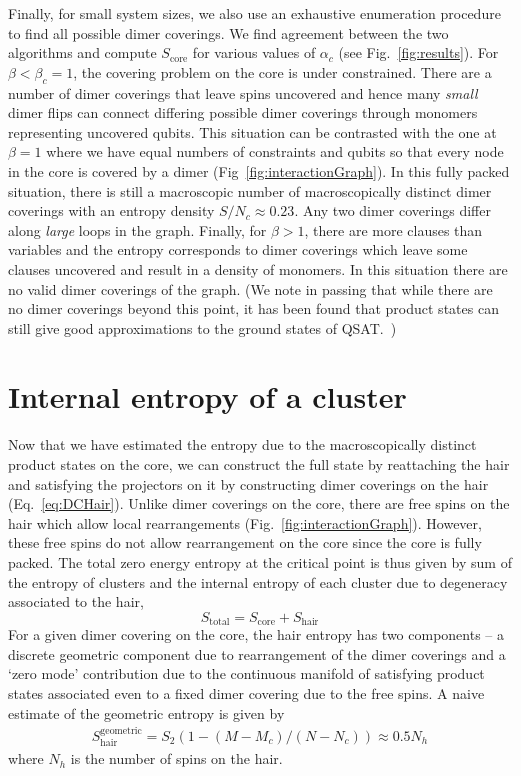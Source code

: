 \documentclass[aps,pra,twocolumn,superscriptaddress,amsmath]{revtex4-1}
\newcommand{\Sc}{S_{\mathrm{core}}}
\begin{document}
Finally, for small system sizes, we also use an exhaustive enumeration procedure to find all possible dimer coverings.
We find agreement between the two algorithms and compute $\Sc$ for various values of $\alpha_{c}$ (see Fig.~\ref{fig:results}). 
For $\beta< \beta_c = 1$, the covering problem on the core is under constrained. There are a number of dimer coverings that leave spins uncovered and hence many \emph{small} dimer flips can connect differing possible dimer coverings through monomers representing uncovered qubits. This situation can be contrasted with the one at $\beta=1$ where we have equal numbers of constraints and qubits so that every node in the core is covered by a dimer (Fig~\ref{fig:interactionGraph}). In this fully packed situation, there is still a macroscopic number of macroscopically distinct dimer coverings with an entropy density $S/N_c \approx 0.23$. Any two dimer coverings differ along \emph{large} loops in the graph. Finally, for $\beta>1$, there are more clauses than variables and the entropy corresponds to dimer coverings which leave some clauses uncovered and result in a density of monomers. In this situation there are no valid dimer coverings of the graph. (We note in passing that while there are no dimer coverings beyond this point, it has been found that product states can still give good approximations to the ground states of QSAT.~\cite{Hsu2013})






\section{Internal entropy of a cluster} %
\label{sub:relation_to_qsat}
Now that we have estimated the entropy due to the macroscopically distinct product states on the core, we can construct the full state by reattaching the hair and satisfying the projectors on it by constructing dimer coverings on the hair (Eq.~\ref{eq:DCHair}). 
Unlike dimer coverings on the core, there are free spins on the hair which allow local rearrangements (Fig.~\ref{fig:interactionGraph}).
However, these free spins do not allow rearrangement on the core since the core is fully packed. 
The total zero energy entropy at the critical point is thus given by sum of the entropy of clusters and the internal entropy of each cluster due to degeneracy associated to the hair,
\begin{equation}
S_{\mathrm{total}} = \Sc + S_{\mathrm{hair}}
\end{equation}
For a given dimer covering on the core, the hair entropy has two components -- a discrete geometric component due to rearrangement of the dimer coverings and a `zero mode' contribution due to the continuous manifold of satisfying product states associated even to a fixed dimer covering due to the free spins. 
A naive estimate of the geometric entropy is given by 
\begin{align}
S_{\mathrm{hair}}^{\mathrm{geometric}} = S_2(1 - (M - M_c)/(N - N_c))
\approx 0.5N_{h}
\end{align}
where $N_h$ is the number of spins on the hair. 
\end{document}
